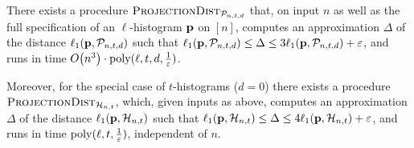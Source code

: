 \begin{lemma}\label{lemma:distance:piecewise}
There exists a procedure $\estimdist[\classpoly]$ that, on input $n$ as well as the full specification of an $\ell$-histogram $\D$ on $[n]$, computes an approximation $\Delta$ of the distance $\lp[1](\D,\classpoly)$ such that $\lp[1](\D,\classpoly) \leq \Delta \leq 3\lp[1](\D,\classpoly)+\eps$, and runs in time $\bigO{n^3}\cdot\poly(\ell,t,d,\frac{1}{\eps})$.

Moreover, for the special case of $t$-histograms ($d=0$) there exists a procedure $\estimdist[\classhist]$, which, given inputs as above, computes an approximation $\Delta$ of the distance $\lp[1](\D,\classhist)$ such that  $\lp[1](\D,\classhist) \leq \Delta \leq 4\lp[1](\D,\classhist)+\eps$, and runs in time $\poly(\ell,t,\frac{1}{\eps})$, independent of $n$.
\end{lemma}
